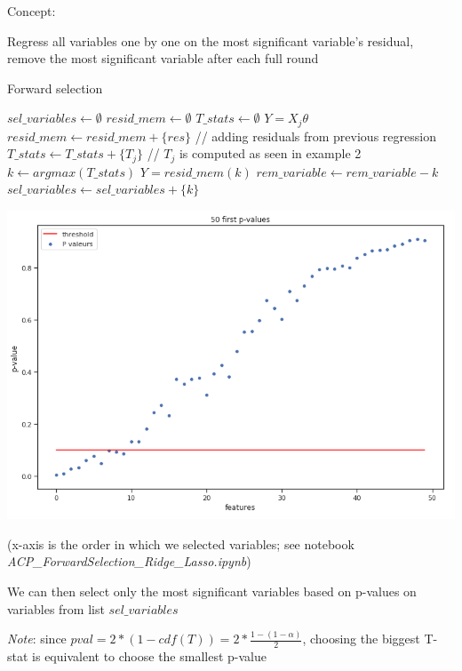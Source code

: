 \vspace{5mm}

Concept: 

Regress all variables one by one on the most significant variable's residual, remove the most significant variable after each full round

\vspace{20mm}

\begin{algorithm}
\caption{Forward selection}
\begin{algorithmic}
\State $sel \_ variables \leftarrow \emptyset$
\State $resid \_mem \leftarrow \emptyset$
\State $T \_stats \leftarrow \emptyset$
\State $Y = X_j\theta$
\State $resid \_mem \leftarrow resid \_mem + \{res\}$ // adding residuals from previous regression
\State $T \_ stats \leftarrow T \_stats + \{T_j\}$ // $T_j$ is computed as seen in example 2
\EndFor
\State $k \leftarrow argmax(T \_ stats)$
\State $Y = resid \_ mem (k)$
\State $rem \_ variable \leftarrow rem \_ variable - {k}$
\State $sel \_ variables \leftarrow sel \_ variables + \{k\}$
\EndFor
\end{algorithmic}
\end{algorithm}

\begin{center}
\includegraphics[scale=0.5]{forward_sel_pval.png}
\end{center}

(x-axis is the order in which we selected variables; see notebook \textit{ACP\_ForwardSelection\_Ridge\_Lasso.ipynb})

We can then select only the most significant variables based on p-values on variables from list $sel \_ variables$

\textit{Note}: since $pval = 2*(1-cdf(T)) = 2*\frac{1-(1-\alpha)}{2}$, choosing the biggest T-stat is equivalent to choose the smallest p-value

\vspace{5mm}